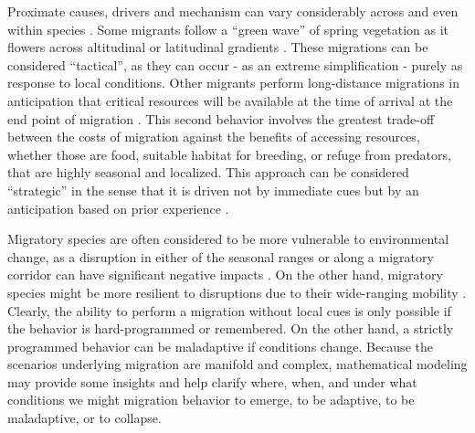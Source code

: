 \documentclass[utf8]{frontiersSCNS} %
\begin{document}
Proximate causes, drivers and mechanism can vary considerably across and even within species \citep{Berthold1999, Shaw2016}. Some migrants follow a ``green wave'' of spring vegetation as it flowers across altitudinal or latitudinal gradients \citep{Bischof2012, Kolzsch2015, Merkle2016}. These migrations can be considered ``tactical'', as they can occur - as an extreme simplification - purely as response to local conditions. Other migrants perform long-distance migrations in anticipation that critical resources will be available at the time of arrival at the end point of migration \citep{Abrahms2019}. This second behavior involves the greatest trade-off between the costs of migration against the benefits of accessing resources, whether those are food, suitable habitat for breeding, or refuge from predators, that are highly seasonal and localized. This approach can be considered ``strategic'' in the sense that it is driven not by immediate cues but by an anticipation based on prior experience \citep{Bracis2017}. 

Migratory species are often considered to be more vulnerable to environmental change, as a disruption in either of the seasonal ranges or along a migratory corridor can have significant negative impacts \citep{Wilcove2008, Kauffman2021}. On the other hand, migratory species might be more resilient to disruptions due to their wide-ranging mobility \citep{Robinson2009}. Clearly, the ability to perform a migration without local cues is only possible if the behavior is hard-programmed or remembered. On the other hand, a strictly programmed behavior can be maladaptive if conditions change. Because the scenarios underlying migration are manifold and complex, mathematical modeling may provide some insights and help clarify where, when, and under what conditions we might migration behavior to emerge, to be adaptive, to be maladaptive, or to collapse.
\end{document}
